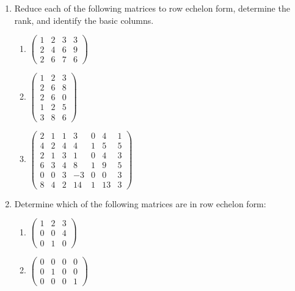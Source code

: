 \begin{enumerate}[leftmargin=*, label=\bfseries 2.1.\arabic*]

\item Reduce each of the following matrices to row echelon form, determine the rank, and identify the basic columns.

\begin{enumerate}[label=(\alph*)]
    \item $\begin{pmatrix}
        1 & 2 & 3 & 3 \\
        2 & 4 & 6 & 9 \\
        2 & 6 & 7 & 6
    \end{pmatrix}$
    
    \item $\begin{pmatrix}
        1 & 2 & 3 \\
        2 & 6 & 8 \\
        2 & 6 & 0 \\
        1 & 2 & 5 \\
        3 & 8 & 6
    \end{pmatrix}$
    
    \item $\begin{pmatrix}
        2 & 1 & 1 & 3 & 0 & 4 & 1 \\
        4 & 2 & 4 & 4 & 1 & 5 & 5 \\
        2 & 1 & 3 & 1 & 0 & 4 & 3 \\
        6 & 3 & 4 & 8 & 1 & 9 & 5 \\
        0 & 0 & 3 & -3 & 0 & 0 & 3 \\
        8 & 4 & 2 & 14 & 1 & 13 & 3
    \end{pmatrix}$
\end{enumerate}

\item Determine which of the following matrices are in row echelon form:

\begin{enumerate}[label=(\alph*)]
    \item $\begin{pmatrix}
        1 & 2 & 3 \\
        0 & 0 & 4 \\
        0 & 1 & 0
    \end{pmatrix}$
    
    \item $\begin{pmatrix}
        0 & 0 & 0 & 0 \\
        0 & 1 & 0 & 0 \\
        0 & 0 & 0 & 1
    \end{pmatrix}$
    

\end{enumerate}
\end{enumerate}
